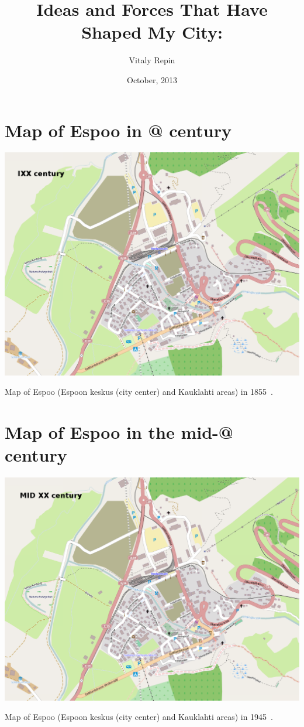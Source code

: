 \documentclass[a4paper]{article}
\author{Vitaly Repin}
\title{Ideas and Forces That Have Shaped My City: \emph{\mycity}}
\date{October, 2013}
\makeatletter
\newcommand*{\rom}[1]{\expandafter\@slowromancap\romannumeral #1@\xspace}
\newcommand{\mycity}{Espoo\xspace}
\makeatother
\begin{document}

\section{Map of \mycity in \rom{19} century}
\includegraphics[keepaspectratio,width=\textwidth]{map1}
\centerline{Map of Espoo (Espoon keskus (city center) and Kauklahti areas) in 1855~\cite{espoo1855}.}

\newpage

\section{Map of \mycity in the mid-\rom{20} century}
\includegraphics[keepaspectratio,width=\textwidth]{map2}
\centerline{Map of Espoo (Espoon keskus (city center) and Kauklahti areas) in 1945~\cite{espoo1945}.}
\end{document}
